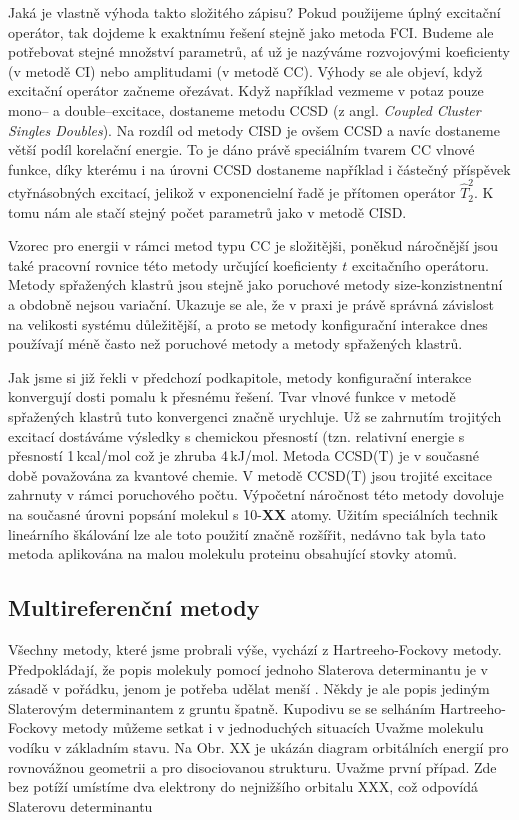 Jaká je vlastně výhoda takto složitého zápisu?
Pokud použijeme úplný excitační operátor, tak dojdeme k exaktnímu řešení stejně jako metoda FCI. Budeme ale potřebovat stejné množství parametrů, ať už je nazýváme rozvojovými koeficienty (v metodě CI) nebo amplitudami (v metodě CC).
Výhody se ale objeví, když excitační operátor začneme ořezávat. Když například vezmeme v potaz pouze mono-- a double--excitace, dostaneme metodu CCSD  (z angl. \textit{Coupled Cluster Singles Doubles}).
Na rozdíl od metody CISD je ovšem CCSD  a navíc dostaneme větší podíl korelační energie.
To je dáno právě speciálním tvarem CC vlnové funkce, díky kterému i na úrovni CCSD dostaneme například i částečný příspěvek ctyřnásobných excitací, jelikož v exponencielní řadě je přítomen operátor $\hat{T}_2^2$. K tomu nám ale stačí stejný počet parametrů jako v metodě CISD.

Vzorec pro energii v rámci metod typu CC je složitějši, poněkud náročnější jsou také pracovní rovnice této metody určující koeficienty $t$ excitačního operátoru. Metody spřažených klastrů jsou stejně jako poruchové metody size-konzistnentní a obdobně nejsou variační. Ukazuje se ale, že v praxi je právě správná závislost na velikosti systému důležitější, a proto se metody konfigurační interakce dnes používají méně často než poruchové metody a metody spřažených klastrů.

Jak jsme si již řekli v předchozí podkapitole, metody konfigurační interakce konvergují dosti pomalu k přesnému řešení. Tvar vlnové funkce v metodě spřažených klastrů tuto konvergenci značně urychluje. Už se zahrnutím trojitých excitací dostáváme výsledky s chemickou přesností (tzn. relativní energie s přesností 1\,kcal/mol což je zhruba 4\,kJ/mol.
Metoda CCSD(T) je v současné době považována za  kvantové chemie. V metodě CCSD(T) jsou trojité excitace zahrnuty v rámci poruchového počtu. Výpočetní náročnost této metody dovoluje na současné úrovni popsání molekul s 10-\textbf{XX} atomy. Užitím speciálních technik lineárního škálování lze ale toto použití značně rozšířit, nedávno tak byla tato metoda aplikována na malou molekulu proteinu obsahující stovky atomů. 

\subsection{Multireferenční metody}

Všechny metody, které jsme probrali výše, vychází z Hartreeho-Fockovy metody. Předpokládají, že popis molekuly pomocí jednoho Slaterova determinantu je v zásadě v pořádku, jenom je potřeba udělat menší . Někdy je ale popis jediným Slaterovým determinantem z gruntu špatně. Kupodivu se se selháním Hartreeho-Fockovy metody můžeme setkat i v jednoduchých situacích Uvažme molekulu vodíku v základním stavu. Na Obr. XX je ukázán diagram orbitálních energií pro rovnovážnou geometrii a pro disociovanou strukturu. Uvažme první případ. Zde bez potíží umístíme dva elektrony do nejnižšího orbitalu XXX, což odpovídá Slaterovu determinantu

